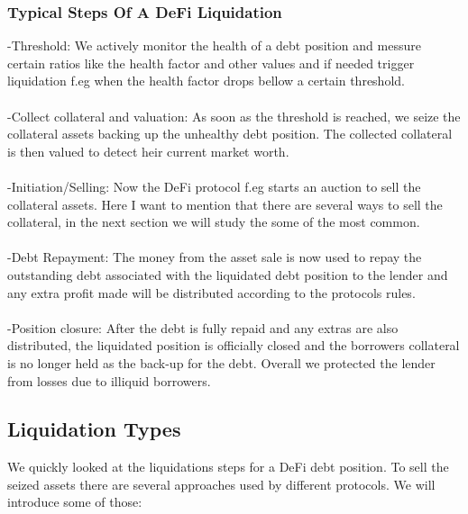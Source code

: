 \documentclass{article}
\begin{document}
    \subsubsection{Typical Steps Of A DeFi Liquidation}
    -Threshold: We actively monitor the health of a debt position and messure certain ratios like the health factor and other values and if needed trigger liquidation f.eg when the health factor drops bellow a certain threshold.\\\\
    -Collect collateral and valuation: As soon as the threshold is reached, we seize the collateral assets backing up the unhealthy debt position. The collected collateral is then valued to detect heir current market worth.\\\\
    -Initiation/Selling: Now the DeFi protocol f.eg starts an auction to sell the collateral assets. Here I want to mention that there are several ways to sell the collateral, in the next section we will study the some of the most common.\\\\
    -Debt Repayment: The money from the asset sale is now used to repay the outstanding debt associated with the liquidated debt position to the lender and any extra profit made will be distributed according to the protocols rules. \\\\
    -Position closure: After the debt is fully repaid and any extras are also distributed, the liquidated position is officially closed and the borrowers collateral is no longer held as the back-up for the debt.  Overall we protected the lender from losses due to illiquid borrowers.


\subsection{Liquidation Types}
We quickly looked at the liquidations steps for a DeFi debt position. To sell the seized assets there are several approaches used by different protocols. We will introduce some of those:
\end{document}
